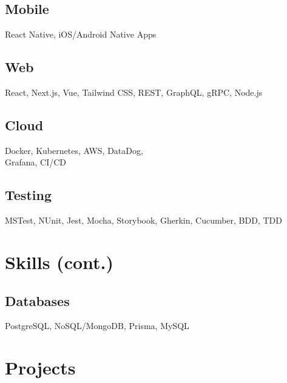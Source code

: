\documentclass{article}
\begin{document}
\begin{paracol}{2}
\begin{leftcolumn}
    \subsection{Mobile}
    React Native, iOS/Android Native Apps

    \vspace{0.5em}

    \subsection{Web}
    React, Next.js, Vue, Tailwind CSS, REST, GraphQL, gRPC, Node.js

    \vspace{0.5em}

    \subsection{Cloud}
    Docker, Kubernetes, AWS, DataDog,\\
    Grafana, CI/CD

    \vspace{0.5em}

    \subsection{Testing}
    MSTest, NUnit, Jest, Mocha, Storybook, Gherkin, Cucumber, BDD, TDD

    \pagebreak
    \section{Skills (cont.)}

    \subsection{Databases}
    PostgreSQL, NoSQL/MongoDB, Prisma, MySQL

    \section{Projects}


\end{leftcolumn}
\end{paracol}
\end{document}
